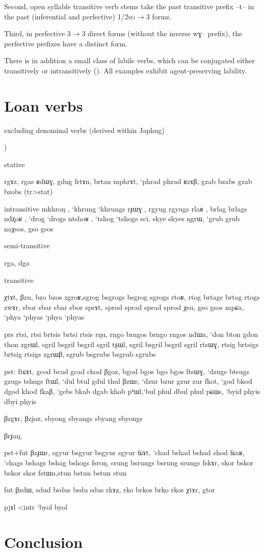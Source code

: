 \documentclass[oldfontcommands,oneside,a4paper,11pt]{article}
\newcommand{\ipa}[1]{{\phon \mbox{#1}}} %
\begin{document}
 Second, open syllable transitive verb stems take the past transitive prefix \ipa{--t--} in the past (inferential and perfective) \textsc{1/2sg}$\rightarrow$3 forms. 
 
 
 Third, in perfective 3$\rightarrow$3 direct forms (without the inverse \ipa{wɣ--} prefix), the perfective prefixes have a distinct form.

There is in addition a small class of labile verbs, which can be conjugated either transitively or intransitively (\citealt{jacques12demotion}). All examples exhibit agent-preserving  lability.
  
  
  \section{Loan verbs}
  
  excluding denominal verbs (derived within Japhug)
  
  
\citealt[133-140]{jacques04these})  
  
stative

rgɤz, rgas
ʁdɯɣ, gdug
frtɤn, brtan
mphrɤt, ‘phrad phrad 
ʁzɤβ, gzab bzabs gzab bzobs (tr>stat)

intransitive
mkhroŋ , ‘khrung ‘khrungs
rɟɯɣ , rgyug rgyugs
rlaʁ , brlag brlags
ndʐoʁ , ‘drog ‘drogs
ntshoʁ , ‘tshog ‘tshogs
sci, skye skyes
ŋgrɯ, ‘grub grub
naχsos, gso gsos

semi-transitive

rga, dga

transitive

χtɤt,
βzu, bzo bzos
zgroʁ,sgrog bsgrogs bsgrog sgrogs
rtoʁ, rtog brtags brtag rtogs
zwɤr, sbor sbar sbar sbor
sprɤt, sprod sprad sprad sprod
χsu, gso gsos
mpɕa, ‘phya ‘phyas ‘phya ‘phyas
 


prs
rtsi, rtsi brtsis brtsi rtsis
rŋu, rngo brngos brngo rngos
ndɯn, ‘don bton gdon thon
zgrɯl, sgril bsgril bsgril sgril
tʂɯl, sgril bsgril bsgril sgril
rtsɯɣ, rtsig brtsigs brtsig rtsigs
zgrɯβ, sgrub bsgrubs bsgrub sgrubs


pst:
ftɕɤt, gcod bcad gcad chod
βgoz, bgod bgos bgo bgos
ftsɯɣ, ‘dzugs btsugs gzugs tshugs
ftɯl, ‘dul btul gdul thul
βzɯr, ‘dzur bzur gzur zur
fkot, ‘god bkod dgod khod
fkaβ, ‘gebs bkab dgab khob
 pʰɯl,‘bul phul dbul phul
 pɕɯs, ‘byid phyis dbyi phyis
 
βzgɤr,
βzjoz, sbyong sbyangs sbyang
sbyongs

βrɟaŋ,

pst+fut
βzɟɯr, sgyur bsgyur bsgyur sgyur
fɕɤt, ‘chad bshad bshad shod
fɕaʁ, ‘chags bshags bshag bshogs
fsroŋ, srung bsrungs bsrung srungs
fskɤr, skor bskor bskor skor
fstɯn,stun bstun bstun stun


fut
βzdɯ, sdud bsdus bsdu sdus
rkɤz, rko brkos brko rkos
χtɤr, gtor

pjɤl <intr ‘byol byol
 

  \section{Conclusion}
  


\end{document}
